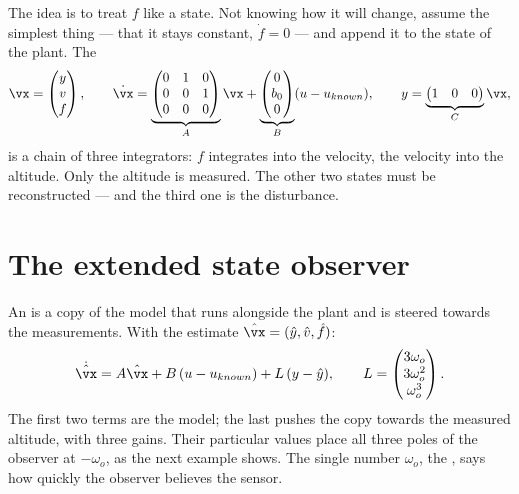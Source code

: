 The idea is to treat $f$ like a state. Not knowing how it will change, assume the simplest thing — that it stays constant, $\dot f = 0$ — and append it to the state of the plant. The 
\begin{equation}\label{eq:adrc-ext}
  \vx = \begin{pmatrix} y\\ v\\ f\end{pmatrix}, \qquad
  \dot{\vx} = \underbrace{\begin{pmatrix} 0 & 1 & 0\\ 0 & 0 & 1\\ 0 & 0 & 0\end{pmatrix}}_{A}\vx
  + \underbrace{\begin{pmatrix} 0\\ b_0\\ 0\end{pmatrix}}_{B}(u - u_{known}) ,
  \qquad y = \underbrace{\begin{pmatrix} 1 & 0 & 0\end{pmatrix}}_{C}\vx ,
\end{equation}
is a chain of three integrators: $f$ integrates into the velocity, the velocity into the altitude. Only the altitude is measured. The other two states must be reconstructed — and the third one is the disturbance.

\section{The extended state observer}

An  is a copy of the model that runs alongside the plant and is steered towards the measurements. With the estimate $\hat{\vx} = (\hat y, \hat v, \hat f)$:
\begin{equation}\label{eq:adrc-eso}
  \dot{\hat{\vx}} = A\hat{\vx} + B\,(u - u_{known}) + L\,(y - \hat y), \qquad
  L = \begin{pmatrix} 3\omega_o\\ 3\omega_o^2\\ \omega_o^3\end{pmatrix} .
\end{equation}
The first two terms are the model; the last pushes the copy towards the measured altitude, with three gains. Their particular values place all three poles of the observer at $-\omega_o$, as the next example shows. The single number $\omega_o$, the , says how quickly the observer believes the sensor.

